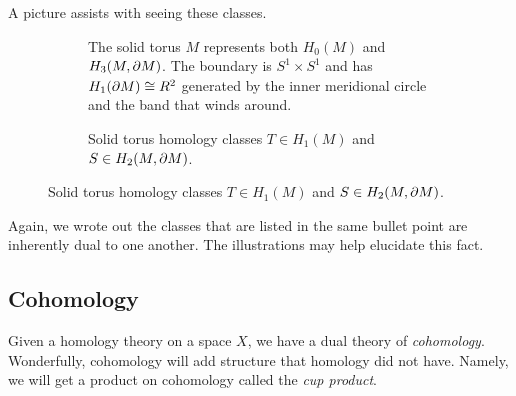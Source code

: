 \documentclass{article}
\begin{document}
A picture assists with seeing these classes.
\begin{figure}[H]
     \centering
     \begin{subfigure}[b]{0.45\textwidth}
         \centering
    	
         \caption{The solid torus $M$ represents both $H_0(M)$ and $H_3(M,{\partial M})$. The boundary is $S^1 \times S^1$ and has $H_1({\partial M})\cong R^2$ generated by the inner meridional  circle and the band that winds around.}
         \label{fig:cavity}
     \end{subfigure}
     \hfill
     \begin{subfigure}[b]{0.45\textwidth}
         \centering
         
         \caption{Solid torus homology classes $T\in H_1(M)$ and $S\in H_2(M,{\partial M})$.}
         \label{fig:cavity_homology}
     \end{subfigure}
\end{figure}
Again, we wrote out the classes that are listed in the same bullet point are inherently dual to one another. The illustrations may help elucidate this fact.



\subsection{Cohomology}

Given a homology theory on a space $X$, we have a dual theory of \emph{cohomology}. Wonderfully, cohomology will add structure that homology did not have. Namely, we will get a product on cohomology called the \emph{cup product}. 
\end{document}
